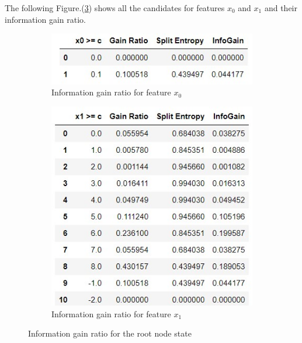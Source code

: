 \documentclass[a4paper]{article}
\theoremstyle{definition}
\newenvironment{soln}{
    \leavevmode\color{blue}\ignorespaces
}{}
\begin{document}
\begin{enumerate}
\begin{soln}
  The following Figure.(\ref{fig:q2_3}) shows all the candidates for features $x_0$ and $x_1$ and their information gain ratio. \\
    \begin{figure}[H]
      \centering
      \begin{subfigure}[b]{0.3\textwidth}
          \centering
          \includegraphics[width=\textwidth]{q2_3_x0.jpg}
          \caption{Information gain ratio for feature $x_0$}
          \label{fig:ig_x0}
      \end{subfigure}
      \begin{subfigure}[b]{0.3\textwidth}
          \centering
          \includegraphics[width=\textwidth]{q2_3_x1.jpg}
          \caption{Information gain ratio for feature $x_1$}
          \label{fig:ig_x2}
      \end{subfigure}
      \caption{Information gain ratio for the root node state}
      \label{fig:q2_3}
  \end{figure}


\end{soln}
\end{enumerate}
\end{document}
